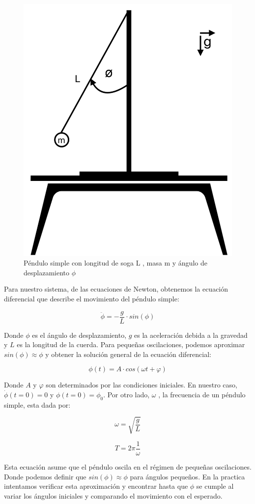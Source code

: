 \documentclass[12pt,a4]{article}
\begin{document}
\begin{figure}[H]
    \centering
    \includegraphics[width=0.3\linewidth]{pendulo_frente.png}
    \caption{Péndulo simple con longitud de soga L , masa m y ángulo de desplazamiento $\phi$}   
    \label{fig:pendulo}
\end{figure}

Para nuestro sistema, de las ecuaciones de Newton, obtenemos la ecuación diferencial que describe el movimiento del péndulo simple:

\begin{equation}
    \ddot{\phi} = -\frac{g}{L} \cdot sin(\phi)
\end{equation}

Donde $\phi$ es el ángulo de desplazamiento, $g$ es la aceleración debida a la gravedad y $L$ es la longitud de la cuerda. 
Para pequeñas oscilaciones, podemos aproximar $sin(\phi) \approx \phi$ y obtener la solución general de la ecuación diferencial:

\begin{equation}
    \phi(t) = A \cdot cos(\omega t + \varphi)
\end{equation}

Donde $A$ y $\varphi$ son determinados por las condiciones iniciales. 
En nuestro caso, $\dot{\phi}(t=0) = 0$ y $\phi(t=0) = \phi_0$. 
Por otro lado, $\omega$ , la frecuencia de un péndulo simple, esta dada por:

\begin{equation}
    \omega = \sqrt{\frac{g}{L}}
    \label{eq:omega}
\end{equation}

\begin{equation}
    T = 2 \pi \frac{1}{\omega}
    \label{eq:periodo}
\end{equation}

Esta ecuación asume que el péndulo oscila en el régimen de pequeñas oscilaciones. 
Donde podemos definir que $sin(\phi) \approx \phi$ para ángulos pequeños. 
En la practica intentamos verificar esta aproximación y encontrar hasta que $\phi$ se cumple al variar los ángulos iniciales y comparando el movimiento con el esperado.
\end{document}
